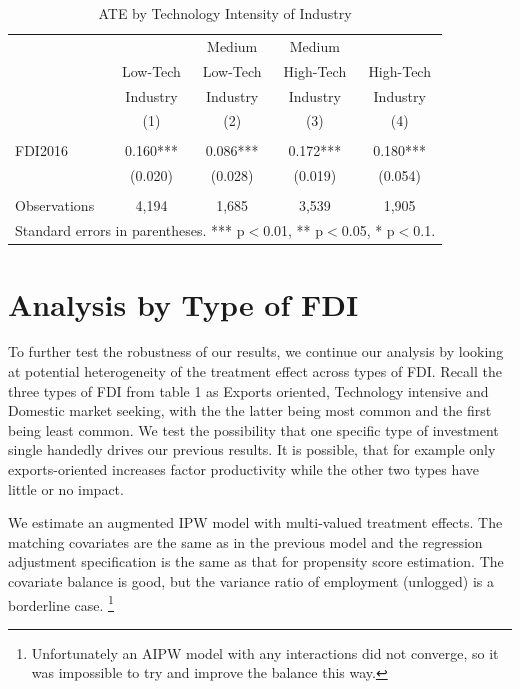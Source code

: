 \documentclass[a4paper,11pt]{scrartcl}
\begin{document}
\begin{table}[h]
  \centering
   \caption{ATE by Technology Intensity of Industry}
   \label{tab:TECH}
\begin{threeparttable}
 
\begin{tabular}{lcccc}
 \hline
 \hline
 & & Medium & Medium &  \\ 
 & Low-Tech & Low-Tech & High-Tech & High-Tech \\ 
 & Industry & Industry & Industry & Industry \\ 
 & (1) & (2) & (3) & (4) \\
 \hline
 &  &  &  &  \\
FDI2016 & 0.160*** & 0.086*** & 0.172*** & 0.180*** \\
	      & (0.020) & (0.028) & (0.019) & (0.054) \\
	      &  &  &  &  \\
 Observations & 4,194 & 1,685 & 3,539 & 1,905 \\ 
	\hline
	\hline
	\multicolumn{5}{c}{\footnotesize{Standard errors in parentheses. *** p$<$0.01, ** p$<$0.05, * p$<$0.1. }}
\end{tabular}

\end{threeparttable}
\end{table}


\section{Analysis by Type of FDI}


To further test the robustness of our results, we continue our analysis by looking at potential heterogeneity of the treatment effect across types of FDI. Recall the three types of FDI from table 1 as Exports oriented, Technology intensive and Domestic market seeking, with the the latter being most common and the first being least common.
We test the possibility that one specific type of investment single handedly drives our previous results.  It is possible, that for example only exports-oriented increases factor productivity while the other two types have little or no impact. 

We estimate an augmented IPW model with multi-valued treatment effects. The matching covariates are the same as in the previous model and the regression adjustment specification is the same as that for propensity score estimation. The covariate balance is good, but the variance ratio of employment (unlogged) is a borderline case. \footnote{Unfortunately an AIPW model with any interactions did not converge, so it was impossible to try and improve the balance this way.}%
\end{document}
